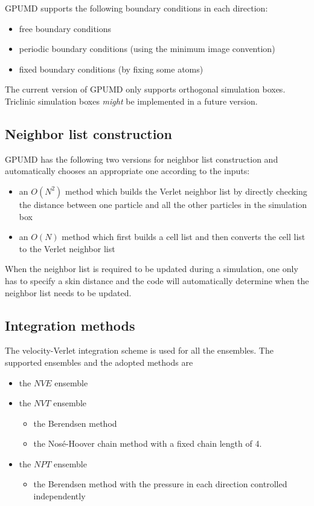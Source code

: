 \documentclass[12pt,a4paper]{report}
\begin{document}
GPUMD supports the following boundary conditions in each direction:
  \begin{itemize}
  \item free boundary conditions
  \item periodic boundary conditions (using the minimum image convention)
  \item fixed boundary conditions (by fixing some atoms)
  \end{itemize}

The current version of GPUMD only supports orthogonal simulation boxes. Triclinic simulation boxes \textit{might} be implemented in a future version.




\subsection{Neighbor list construction}

GPUMD has the following two versions for neighbor list construction and automatically chooses an appropriate one according to the inputs:
  \begin{itemize}
  \item an $O(N^2)$ method which builds the Verlet neighbor list by directly checking the distance between one particle and all the other particles in the simulation box
  \item an $O(N)$ method which first builds a cell list and then converts the cell list to the Verlet neighbor list
  \end{itemize}
When the neighbor list is required to be updated during a simulation, one only has to specify a skin distance and the code will automatically determine when the neighbor list needs to be updated.

\subsection{Integration methods}

The velocity-Verlet \cite{swope1982jcp} integration scheme is used for all the ensembles.
The supported ensembles and the adopted methods are
  \begin{itemize}
  \item the $NVE$ ensemble
  \item the $NVT$ ensemble
    \begin{itemize}
    \item the Berendsen method  \cite{berendsen1984jcp}
    \item the Nos\'{e}-Hoover chain method \cite{nose1984jcp,hoover1985pra,martyna1992jcp,martyna1996mp,tuckerman2010}
        with a fixed chain length of 4.
    \end{itemize}
  \item the $NPT$ ensemble
    \begin{itemize}
    \item the Berendsen method  \cite{berendsen1984jcp} with the pressure in each direction controlled independently
    \end{itemize}
  \end{itemize}
\end{document}
